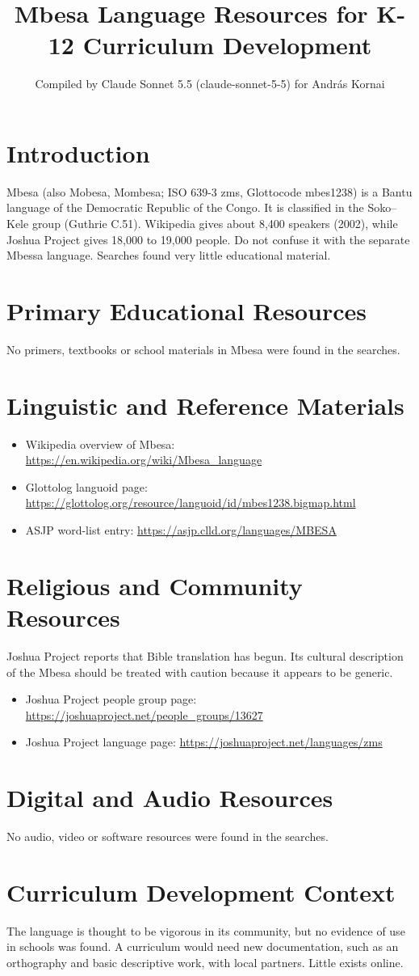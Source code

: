 \documentclass[12pt]{article}
\title{Mbesa Language Resources for K-12 Curriculum Development}
\author{Compiled by Claude Sonnet 5.5 (claude-sonnet-5-5) for Andr\'as Kornai}
\date{}
\begin{document}
\maketitle

\section{Introduction}
Mbesa (also Mobesa, Mombesa; ISO 639-3 zms, Glottocode mbes1238) is a Bantu language of the Democratic Republic of the Congo. It is classified in the Soko--Kele group (Guthrie C.51). Wikipedia gives about 8,400 speakers (2002), while Joshua Project gives 18,000 to 19,000 people. Do not confuse it with the separate Mbessa language. Searches found very little educational material.

\section{Primary Educational Resources}
No primers, textbooks or school materials in Mbesa were found in the searches.

\section{Linguistic and Reference Materials}
\begin{itemize}
\item Wikipedia overview of Mbesa: \url{https://en.wikipedia.org/wiki/Mbesa_language}
\item Glottolog languoid page: \url{https://glottolog.org/resource/languoid/id/mbes1238.bigmap.html}
\item ASJP word-list entry: \url{https://asjp.clld.org/languages/MBESA}
\end{itemize}

\section{Religious and Community Resources}
Joshua Project reports that Bible translation has begun. Its cultural description of the Mbesa should be treated with caution because it appears to be generic.
\begin{itemize}
\item Joshua Project people group page: \url{https://joshuaproject.net/people_groups/13627}
\item Joshua Project language page: \url{https://joshuaproject.net/languages/zms}
\end{itemize}

\section{Digital and Audio Resources}
No audio, video or software resources were found in the searches.

\section{Curriculum Development Context}
The language is thought to be vigorous in its community, but no evidence of use in schools was found. A curriculum would need new documentation, such as an orthography and basic descriptive work, with local partners. Little exists online.
\end{document}

